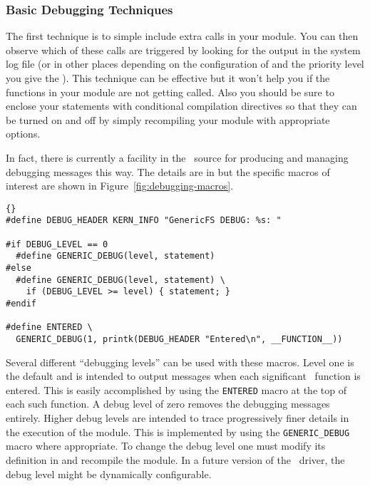\subsubsection{Basic Debugging Techniques}

The first technique is to simple include extra  calls in your module. You can then
observe which of these calls are triggered by looking for the output in the system log file (or
in other places depending on the configuration of  and the priority level you
give the ). This technique can be effective but it won't help you if the functions
in your module are not getting called. Also you should be sure to enclose your 
statements with conditional compilation directives so that they can be turned on and off by
simply recompiling your module with appropriate options.

In fact, there is currently a facility in the \GenericFS\ source for producing and managing
debugging messages this way. The details are in  but the specific macros of
interest are shown in Figure~\ref{fig:debugging-macros}.

\begin{figure*}[htbp]
  \centering
  \begin{wbigbox}
\begin{lstlisting}{}
#define DEBUG_HEADER KERN_INFO "GenericFS DEBUG: %s: "

#if DEBUG_LEVEL == 0
  #define GENERIC_DEBUG(level, statement)
#else
  #define GENERIC_DEBUG(level, statement) \
    if (DEBUG_LEVEL >= level) { statement; }
#endif

#define ENTERED \
  GENERIC_DEBUG(1, printk(DEBUG_HEADER "Entered\n", __FUNCTION__))
\end{lstlisting}
  \end{wbigbox}
  \caption{\GenericFS\ Debugging Macros (in )}
  \label{fig:debugging-macros}
\end{figure*}

Several different ``debugging levels'' can be used with these macros. Level one is the default
and is intended to output messages when each significant \GenericFS\ function is entered. This
is easily accomplished by using the \texttt{ENTERED} macro at the top of each such function. A
debug level of zero removes the debugging messages entirely. Higher debug levels are intended to
trace progressively finer details in the execution of the module. This is implemented by using
the \texttt{GENERIC\-\_DEBUG} macro where appropriate. To change the debug level one must modify
its definition in \filename{global.h} and recompile the module. In a future version of the
\GenericFS\ driver, the debug level might be dynamically configurable.


